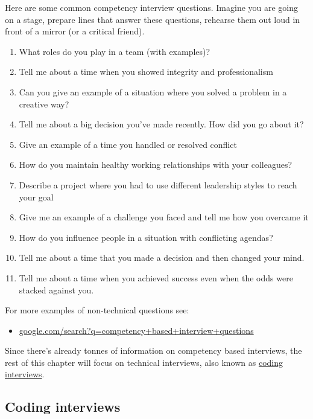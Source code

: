 \documentclass[
]{book}
\providecommand{\tightlist}{%
  \setlength{\itemsep}{0pt}\setlength{\parskip}{0pt}}
\begin{document}
Here are some common competency interview questions. Imagine you are going on a stage, prepare lines that answer these questions, rehearse them out loud in front of a mirror (or a critical friend).

\begin{enumerate}
\def\labelenumi{\arabic{enumi}.}
\tightlist
\item
  What roles do you play in a team (with examples)?
\item
  Tell me about a time when you showed integrity and professionalism
\item
  Can you give an example of a situation where you solved a problem in a creative way?
\item
  Tell me about a big decision you've made recently. How did you go about it?
\item
  Give an example of a time you handled or resolved conflict
\item
  How do you maintain healthy working relationships with your colleagues?
\item
  Describe a project where you had to use different leadership styles to reach your goal
\item
  Give me an example of a challenge you faced and tell me how you overcame it
\item
  How do you influence people in a situation with conflicting agendas?
\item
  Tell me about a time that you made a decision and then changed your mind.
\item
  Tell me about a time when you achieved success even when the odds were stacked against you.
\end{enumerate}

For more examples of non-technical questions see:

\begin{itemize}
\tightlist
\item
  \href{https://www.google.com/search?q=competency+based+interview+questions}{google.com/search?q=competency+based+interview+questions}
\end{itemize}

Since there's already tonnes of information on competency based interviews, the rest of this chapter will focus on technical interviews, also known as \href{https://en.wikipedia.org/wiki/Coding_interview}{coding interviews}.

\hypertarget{codinginterview}{%
\subsection{Coding interviews}\label{codinginterview}}
\end{document}

